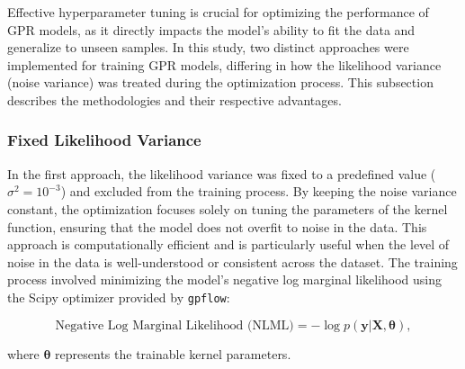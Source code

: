 Effective hyperparameter tuning is crucial for optimizing the performance of \ac{GPR} models, as it directly impacts the model's ability to fit the data and generalize to unseen samples. In this study, two distinct approaches were implemented for training \ac{GPR} models, differing in how the likelihood variance (noise variance) was treated during the optimization process. This subsection describes the methodologies and their respective advantages.

\subsubsection{Fixed Likelihood Variance}

In the first approach, the likelihood variance was fixed to a predefined value ($\sigma^2 = 10^{-3}$) and excluded from the training process. By keeping the noise variance constant, the optimization focuses solely on tuning the parameters of the kernel function, ensuring that the model does not overfit to noise in the data. This approach is computationally efficient and is particularly useful when the level of noise in the data is well-understood or consistent across the dataset. The training process involved minimizing the model's negative log marginal likelihood using the Scipy optimizer provided by \texttt{gpflow}:

\begin{equation}
\text{Negative Log Marginal Likelihood (NLML)} = -\log p(\mathbf{y} | \mathbf{X}, \boldsymbol{\theta}),
\end{equation}

where $\boldsymbol{\theta}$ represents the trainable kernel parameters.

